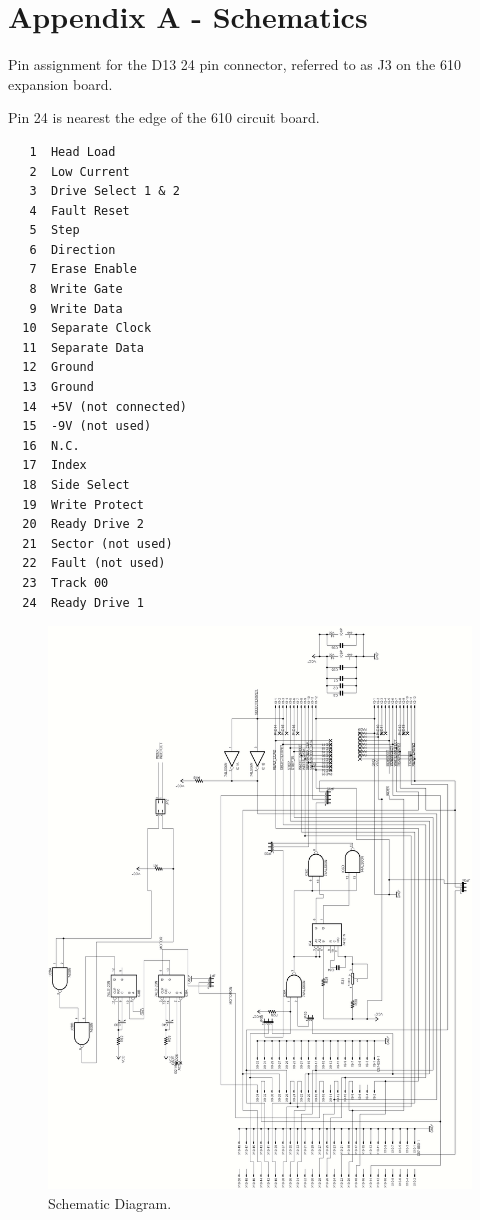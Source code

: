 \chapter{Appendix A - Schematics}


Pin assignment for the D13 24 pin connector, referred to as J3 on the 610 expansion board.

Pin 24 is nearest the edge of the 610 circuit board.

\begin{verbatim}
   1  Head Load             
   2  Low Current           
   3  Drive Select 1 & 2    
   4  Fault Reset           
   5  Step                  
   6  Direction             
   7  Erase Enable          
   8  Write Gate            
   9  Write Data            
  10  Separate Clock        
  11  Separate Data         
  12  Ground                
  13  Ground                
  14  +5V (not connected)   
  15  -9V (not used)        
  16  N.C.                  
  17  Index                 
  18  Side Select           
  19  Write Protect         
  20  Ready Drive 2         
  21  Sector (not used)     
  22  Fault (not used)      
  23  Track 00              
  24  Ready Drive 1         
\end{verbatim}

\begin{figure}[htbp]
\begin{center}
\includegraphics[width=4.9in]{images/schematic_bw.png}
\caption{Schematic Diagram.}
\label{fig:schematic}
\end{center}
\end{figure}

